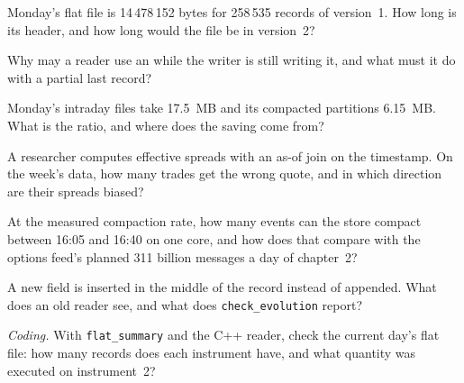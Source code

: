\begin{exercise}[$\star$]\label{exo:pl:a-tick-store-on-open-formats:1}
Monday's flat file is 14\,478\,152 bytes for 258\,535 records of version~1. How long is its header, and how long would the file
be in version~2?
\end{exercise}

\begin{exercise}[$\star$]\label{exo:pl:a-tick-store-on-open-formats:2}
Why may a reader use an  while the writer is still writing it, and what must it do with a partial last record?
\end{exercise}

\begin{exercise}[$\star$]\label{exo:pl:a-tick-store-on-open-formats:3}
Monday's intraday files take 17.5~MB and its compacted partitions 6.15~MB. What is the ratio, and where does the saving come
from?
\end{exercise}

\begin{exercise}[$\star\star$]\label{exo:pl:a-tick-store-on-open-formats:4}
A researcher computes effective spreads with an as-of join on the timestamp. On the week's data, how many trades get the wrong
quote, and in which direction are their spreads biased?
\end{exercise}

\begin{exercise}[$\star\star$]\label{exo:pl:a-tick-store-on-open-formats:5}
At the measured compaction rate, how many events can the store compact between 16:05 and 16:40 on one core, and how does that
compare with the options feed's planned 311 billion messages a day of chapter~2?
\end{exercise}

\begin{exercise}[$\star\star$]\label{exo:pl:a-tick-store-on-open-formats:6}
A new field is inserted in the middle of the record instead of appended. What does an old reader see, and what does
\texttt{check\_evolution} report?
\end{exercise}

\begin{exercise}[$\star\star\star$]\label{exo:pl:a-tick-store-on-open-formats:7}
\emph{Coding.} With \texttt{flat\_summary} and the C++ reader, check the current day's flat file: how many records does each
instrument have, and what quantity was executed on instrument~2?
\end{exercise}

